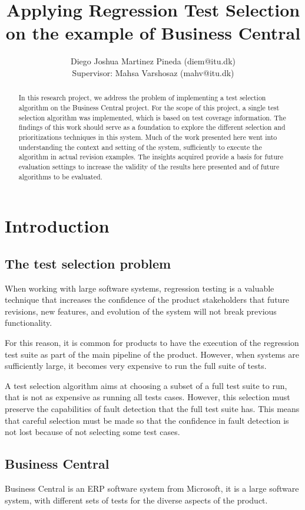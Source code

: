 \documentclass{article}
\title{Applying Regression Test Selection on the example of Business Central}
\author{Diego Joshua Martinez Pineda (diem@itu.dk)\\Supervisor: Mahsa Varshosaz (mahv@itu.dk)}
\begin{document}
\maketitle

\begin{abstract}
In this research project, we address the problem of implementing a test selection algorithm on the Business Central project. For the scope of this project, a single test selection algorithm was implemented, which is based on test coverage information. The findings of this work should serve as a foundation to explore the different selection and prioritizations techniques in this system. Much of the work presented here went into understanding the context and setting of the system, sufficiently to execute the algorithm in actual revision examples. The insights acquired provide a basis for future evaluation settings to increase the validity of the results here presented and of future algorithms to be evaluated.
\end{abstract}

\section{Introduction}
\subsection{The test selection problem}
   When working with large software systems, regression testing is a valuable technique that increases the confidence of the product stakeholders that future revisions, new features, and evolution of the system will not break previous functionality.

   For this reason, it is common for products to have the execution of the regression test suite as part of the main pipeline of the product. However, when systems are sufficiently large, it becomes very expensive to run the full suite of tests.

   A test selection algorithm aims at choosing a subset of a full test suite to run, that is not as expensive as running all tests cases. However, this selection must preserve the capabilities of fault detection that the full test suite has. This means that careful selection must be made so that the confidence in fault detection is not lost because of not selecting some test cases.

\subsection{Business Central}
   Business Central is an ERP software system from Microsoft, it is a large software system, with different sets of tests for the diverse aspects of the product.
\end{document}
